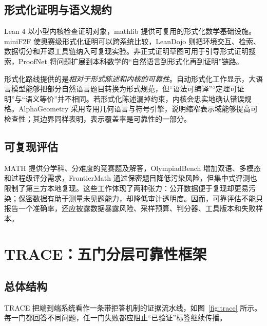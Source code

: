 \documentclass[UTF8,11pt,a4paper,fontset=fandol]{ctexart}
\newcommand{\trace}{\textsf{TRACE}}
\begin{document}
\subsection{形式化证明与语义规约}
Lean 4 以小型内核检查证明对象\cite{demoura2021lean4}，mathlib 提供可复用的形式化数学基础设施\cite{mathlib2020}。miniF2F 使奥赛级形式化证明可以跨系统比较\cite{zheng2022minif2f}，LeanDojo 则把环境交互、检索、数据切分和开源工具链纳入可复现实验\cite{yang2023leandojo}。非正式证明草图可用于引导形式证明搜索\cite{jiang2023draft}，ProofNet 将问题扩展到本科数学的“自然语言到形式化再到证明”链路\cite{azerbayev2023proofnet}。

形式化路线提供的是\emph{相对于形式陈述和内核的可靠性}。自动形式化工作显示，大语言模型能够把部分自然语言题目转换为形式规范\cite{wu2022autoformalization}，但“语法可编译”“定理可证明”与“语义等价”并不相同。若形式化陈述漏掉约束，内核会忠实地确认错误规格。AlphaGeometry 采用专用几何语言与符号引擎，说明缩窄表示域能够提高可检查性\cite{trinh2024alphageometry}；其边界同样表明，表示覆盖率是可靠性的一部分。

\subsection{可复现评估}
MATH 提供分学科、分难度的竞赛题及解答\cite{hendrycks2021math}，OlympiadBench 增加双语、多模态和过程级评分需求\cite{he2024olympiadbench}，FrontierMath 通过保密题目降低污染风险，但集中式评测也限制了第三方本地复现\cite{glazer2024frontiermath}。这些工作体现了两种张力：公开数据便于复现却更易污染；保密数据有助于测量未见题能力，却降低审计透明度。因而，可靠评估不能只报告一个准确率，还应披露数据暴露风险、采样预算、判分器、工具版本和失败样本。

\section{\trace{}：五门分层可靠性框架}
\subsection{总体结构}
\trace{} 把端到端系统看作一条带拒答机制的证据流水线，如图~\ref{fig:trace} 所示。每一门都回答不同问题，任一门失败都应阻止“已验证”标签继续传播。
\end{document}
